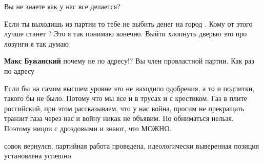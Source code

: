 \begin{itemize}
\begin{itemize}
 
Вы не знаете как у нас все делается?

 

Если ты выходишь из партии то тебе не выбить денег на город . Кому от этого
лучше станет ? Это я так понимаю конечно. Выйти хлопнуть дверью это про лозунги
я так думаю


 
\textbf{Макс Бужанский} почему не по адресу!? Вы член провластной партии. Как раз по адресу

\end{itemize}

 

Если бы на самом высшем уровне это не находило одобрения, а то и подпитки,
такого бы не было. Потому что мы все и в трусах и с крестиком. Газ в плите
российский, при этом рассказываем, что у нас война, просим не прекращать
транзит газа через нас и войну никак не объявим. Но обниматься нельзя. Поэтому
ницои с дроздовыми и знают, что МОЖНО.


 

совок вернулся, партийная работа проведена, идеологически выверенная позиция
установлена успешно


 


\end{itemize}
